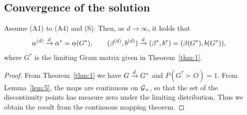 \subsection{Convergence of the solution}

\begin{theorem}
\label{thm:2}
Assume \textup{(A1)} to \textup{(A4)} and \textup{(S)}. Then, as $d\to\infty$,
it holds that
\[
\alpha^{(d)}\xrightarrow{d}\alpha^*=\alpha(G^*),
\qquad
(\beta^{(d)},b^{(d)})\xrightarrow{d}(\beta^*,b^*)=(\beta(G^*),b(G^*)),
\]
where $G^*$ is the limiting Gram matrix given in Theorem~\ref{thm:1}.
\end{theorem}

\begin{proof}
From Theorem~\ref{thm:1} we have $G\xrightarrow{d} G^*$ and $P(G^*\succ O)=1$. From
Lemma~\ref{lem:5}, the maps are continuous on $\mathcal{G}_+$, so that the set of the
discontinuity points has measure zero under the limiting distribution. Thus we
obtain the result from the continuous mapping theorem.
\end{proof}
